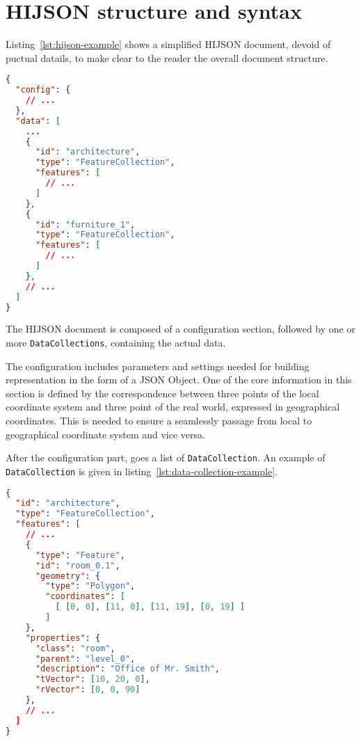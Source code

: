 
\section{HIJSON structure and syntax}\label{hijson-syntax}

Listing~\ref{lst:hijson-example} shows a simplified HIJSON document, devoid of puctual datails, to make clear to the reader the overall document structure.

\begin{lstlisting}[language=json, label={lst:hijson-example}, captionpos=b, caption=Example of HIJSON document.]
{
  "config": {
    // ...
  },
  "data": [
    ...
    {
      "id": "architecture",
      "type": "FeatureCollection",
      "features": [
        // ...
      ] 
    },
    {
      "id": "furniture_1",
      "type": "FeatureCollection",
      "features": [
        // ...
      ] 
    },
    // ...
  ]
}
\end{lstlisting}


The HIJSON document is composed of a configuration section, followed by one or more {\tt DataCollections}, containing the actual data.

The configuration includes parameters and settings needed for building representation in the form of a JSON Object. One of the core information in this section is defined by the correspondence between three points of the local coordinate system and three point of the real world, expressed in geographical coordinates. This is needed to ensure a seamlessly passage from local to geographical coordinate system and vice versa.

After the configuration part, goes a list of {\tt DataCollection}. An example
of {\tt DataCollection} is given in listing~\ref{lst:data-collection-example}.


\begin{lstlisting}[language=json, label={lst:data-collection-example}, captionpos=b,  caption=Example of {\tt DataCollection}.]
{
  "id": "architecture",
  "type": "FeatureCollection",
  "features": [
    // ...
    {
      "type": "Feature",
      "id": "room_0.1",
      "geometry": {
        "type": "Polygon",
        "coordinates": [ 
          [ [0, 0], [11, 0], [11, 19], [0, 19] ]
        ]
    },
    "properties": {
      "class": "room",
      "parent": "level_0",
      "description": "Office of Mr. Smith",
      "tVector": [10, 20, 0],
      "rVector": [0, 0, 90]
    },
    // ...
  ]
}
\end{lstlisting}

